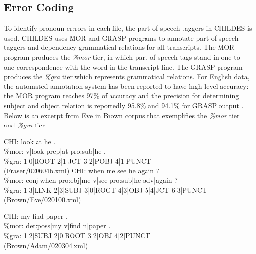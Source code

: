 \subsection{Error Coding}
To identify pronoun errrors in each file, the part-of-speech taggers in CHILDES is used. CHILDES uses MOR and GRASP programs to annotate part-of-speech taggers and dependency grammatical relations for all transcripts. The MOR program produces the \textit{\%mor} tier, in which part-of-speech tags stand in one-to-one correspondence with the word in the transcript line. The GRASP program produces the \textit{\%gra} tier which represents grammatical relations. For English data, the automated annotation system has been reported to have high-level accuracy: the MOR program reaches 97\% of accuracy and the precision for determining subject and object relation is reportedly 95.8\% and 94.1\% for GRASP output \citep{macwhinney2012morphosyntactic,sagae2010morphosyntactic}.  Below is an excerpt from Eve in Brown corpus that exemplifies the \textit{\%mor} tier and \textit{\%gra} tier.
\begin{exe}
\ex \label{lookathe}\gll *CHI:	look at he .\\
\%mor:	v|look prep|at pro:sub|he .\\
\%gra:	1|0|ROOT 2|1|JCT 3|2|POBJ 4|1|PUNCT\\
(Fraser/020604b.xml)
\ex \label{meseehe}\gll *CHI: when me see he again ?\\
\%mor: conj|when pro:obj|me v|see pro:sub|he adv|again ? \\
\%gra: 1|3|LINK 2|3|SUBJ 3|0|ROOT 4|3|OBJ 5|4|JCT 6|3|PUNCT \\
(Brown/Eve/020100.xml)

\ex \label{myfine} \gll *CHI:	my find paper .\\
	\%mor:	det:poss|my v|find n|paper .\\
	\%gra:	1|2|SUBJ 2|0|ROOT 3|2|OBJ 4|2|PUNCT\\
(Brown/Adam/020304.xml)
\end{exe}
